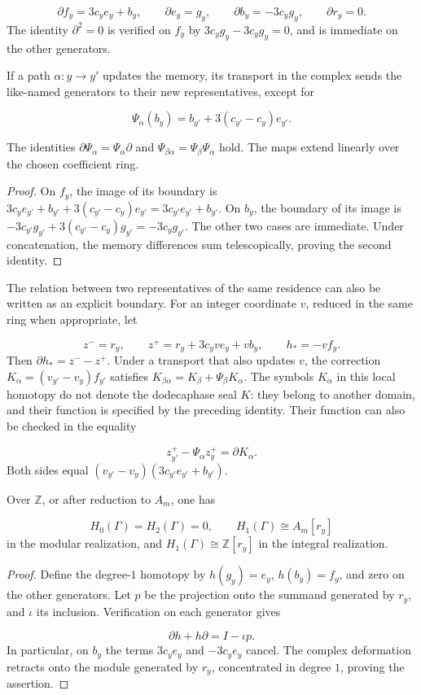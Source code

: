 \[
\partial f_y=3c_y e_y+b_y,\qquad
\partial e_y=g_y,\qquad
\partial b_y=-3c_y g_y,\qquad
\partial r_y=0.
\]
The identity \(\partial^2=0\) is verified on \(f_y\) by \(3c_yg_y-3c_yg_y=0\), and is immediate on the other generators.

If a path \(\alpha:y\to y'\) updates the memory, its transport in the complex sends the like-named generators to their new representatives, except for

\[
\Psi_\alpha(b_y)=b_{y'}+3(c_{y'}-c_y)e_{y'}.
\]
\begin{proposition}
\label{prop:continuo-naturalidad-memoria}
The identities \(\partial\Psi_\alpha=\Psi_\alpha\partial\) and \(\Psi_{\beta\alpha}=\Psi_\beta\Psi_\alpha\) hold. The maps extend linearly over the chosen coefficient ring.
\end{proposition}
\begin{proof}
On \(f_y\), the image of its boundary is \(3c_ye_{y'}+b_{y'}+3(c_{y'}-c_y)e_{y'} =3c_{y'}e_{y'}+b_{y'}\). On \(b_y\), the boundary of its image is \(-3c_{y'}g_{y'}+3(c_{y'}-c_y)g_{y'}=-3c_yg_{y'}\). The other two cases are immediate. Under concatenation, the memory differences sum telescopically, proving the second identity.
\end{proof}

The relation between two representatives of the same residence can also be written as an explicit boundary. For an integer coordinate \(v\), reduced in the same ring when appropriate, let

\[
z^-=r_y,\qquad z^+=r_y+3c_yv e_y+v b_y,
\qquad h_*=-vf_y.
\]
Then \(\partial h_*=z^--z^+\). Under a transport that also updates \(v\), the correction \(K_\alpha=(v_{y'}-v_y)f_{y'}\) satisfies \(K_{\beta\alpha}=K_\beta+\Psi_\beta K_\alpha\). The symbols \(K_\alpha\) in this local homotopy do not denote the dodecaphase seal \(K\): they belong to another domain, and their function is specified by the preceding identity. Their function can also be checked in the equality

\[
z^+_{y'}-\Psi_\alpha z^+_y=\partial K_\alpha.
\]
Both sides equal \((v_{y'}-v_y)(3c_{y'}e_{y'}+b_{y'})\).

\begin{proposition}
\label{prop:continuo-homologia-memoria}
Over \(\mathbb Z\), or after reduction to \(A_m\), one has

\[
H_0(\Gamma)=H_2(\Gamma)=0,
\qquad H_1(\Gamma)\cong A_m[r_y]
\]
in the modular realization, and \(H_1(\Gamma)\cong\mathbb Z[r_y]\) in the integral realization.
\end{proposition}
\begin{proof}
Define the degree-\(1\) homotopy by \(h(g_y)=e_y\), \(h(b_y)=f_y\), and zero on the other generators. Let \(p\) be the projection onto the summand generated by \(r_y\), and \(\iota\) its inclusion. Verification on each generator gives

\[
\partial h+h\partial=I-\iota p.
\]
In particular, on \(b_y\) the terms \(3c_ye_y\) and \(-3c_ye_y\) cancel. The complex deformation retracts onto the module generated by \(r_y\), concentrated in degree \(1\), proving the assertion.
\end{proof}

